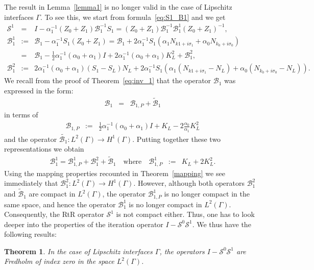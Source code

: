 \documentclass[11pt]{article}
\numberwithin{equation}{section}
\newtheorem{theorem}{Theorem}[section]
\begin{document}
The result in Lemma~\ref{lemma1} is no longer valid in the case of Lipschitz interfaces $\Gamma$. To see this, we start from formula~\eqref{eq:S1_B1} and we get
  \begin{eqnarray*}
    \mathcal{S}^1&=&I-\alpha_1^{-1}(Z_0+Z_1)\mathcal{B}_1^{-1}S_1=(Z_0+Z_1)\mathcal{B}_1^{-1}\mathcal{B}_1^1(Z_0+Z_1)^{-1},\\
    \mathcal{B}_1^1&:=&\mathcal{B}_1-\alpha_1^{-1}S_1(Z_0+Z_1)=\mathcal{B}_1+2\alpha_1^{-1}S_1(\alpha_1N_{k1+i\sigma_1}+\alpha_0N_{k_0+i\sigma_0})\\
    &=&\mathcal{B}_1-\frac{1}{2}\alpha_1^{-1}(\alpha_0+\alpha_1)I + 2\alpha_1^{-1}(\alpha_0+\alpha_1)K_L^2+ \mathcal{B}_1^2,\\
    \mathcal{B}_1^2&:=&2\alpha_1^{-1}(\alpha_0+\alpha_1)(S_1-S_L)N_L+2\alpha_1^{-1}S_1(\alpha_1(N_{k1+i\sigma_1}-N_L)+\alpha_0(N_{k_0+i\sigma_0}-N_L)).
  \end{eqnarray*}
  We recall from the proof of Theorem~\ref{eq:inv_1} that the operator $\mathcal{B}_1$ was expressed in the form:
  \begin{eqnarray}
    \mathcal{B}_1&=&\mathcal{B}_{1,P}+\widetilde{\mathcal{B}}_1
  \end{eqnarray}
in terms of 
    \begin{eqnarray}
    \mathcal{B}_{1,P}&:=&\frac{1}{2}\alpha_1^{-1}(\alpha_0+\alpha_1)I+K_L-2\frac{\alpha_0}{\alpha_1}K^2_L
  \end{eqnarray}
and   the operator $\widetilde{\mathcal{B}_1}:L^2(\Gamma)\to H^1(\Gamma)$. Putting together these two representations we obtain
  \begin{eqnarray}
    \mathcal{B}_1^1=\mathcal{B}_{1,P}^1+\mathcal{B}_1^2+\widetilde{\mathcal{B}}_1\quad\mbox{where}\quad
    \mathcal{B}_{1,P}^1&:=&K_L+2K_L^2.\label{eq:b_1p}
  \end{eqnarray}
  Using the mapping properties recounted in Theorem~\ref{mapping} we see immediately that $\mathcal{B}_1^2:L^2(\Gamma)\to H^1(\Gamma)$. However, although both operators $\mathcal{B}_1^2$ and $\widetilde{\mathcal{B}}_1$ are compact in $L^2(\Gamma)$, the operator $\mathcal{B}_{1,P}^1$ is no longer compact in the same space, and hence the operator $\mathcal{B}_1^1$ is no longer compact in $L^2(\Gamma)$. Consequently, the RtR operator $\mathcal{S}^1$ is not compact either. Thus, one has to look deeper into the properties of the iteration operator $I-\mathcal{S}^0\mathcal{S}^1$. We thus have the following results:
\begin{theorem}\label{thm_Fredholm}
  In the case of Lipschitz interfaces $\Gamma$, the operators $I-\mathcal{S}^0\mathcal{S}^1$ are Fredholm of index zero in the space $L^2(\Gamma)$.
  \end{theorem}
\end{document}
